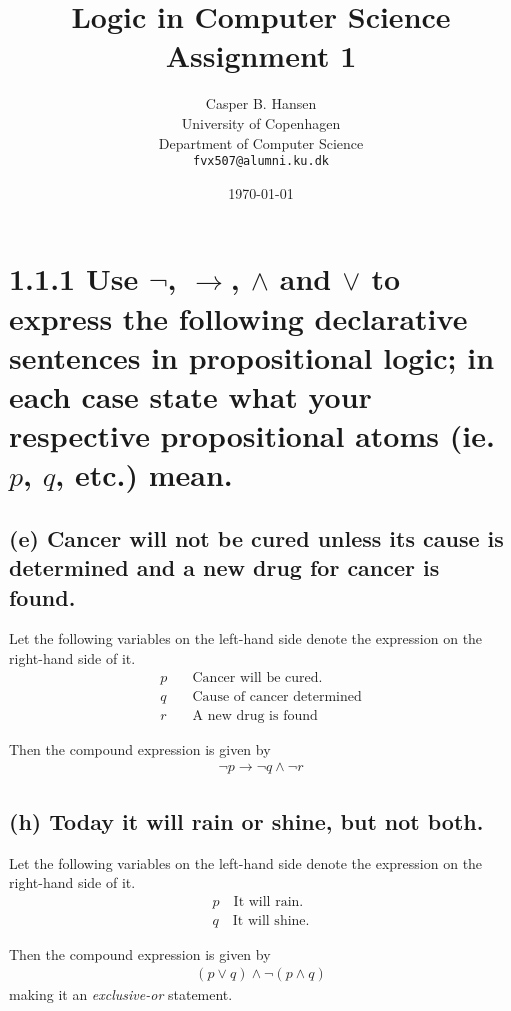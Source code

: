 \documentclass[11pt,a4paper]{article}
\title
{
{\Large Logic in Computer Science}\\
Assignment 1
}
\author
{
	Casper B. Hansen\\
	University of Copenhagen\\
	Department of Computer Science\\
	{\tt fvx507@alumni.ku.dk}
}
\date{\today}
\let\implies\to
\begin{document}
\maketitle

\section*{1.1.1 \mdseries Use $\neg$, $\implies$, $\land$ and $\lor$ to express the following declarative sentences in propositional logic; in each case state what your respective propositional atoms (ie. $p$, $q$, etc.) mean.}

\subsection*{(e) \mdseries Cancer will not be cured unless its cause is determined and a new drug for cancer is found.}

Let the following variables on the left-hand side denote the expression on the right-hand side of it.
\begin{align*}
	p \quad &\text{Cancer will be cured.} \\
	q \quad &\text{Cause of cancer determined} \\
	r \quad &\text{A new drug is found}
\end{align*}

Then the compound expression is given by
\begin{align*}
	\neg p \implies \neg q \land \neg r
\end{align*}

\subsection*{(h) \mdseries Today it will rain or shine, but not both.}

Let the following variables on the left-hand side denote the expression on the right-hand side of it.
\begin{align*}
	p \quad \text{It will rain.} \\
	q \quad \text{It will shine.}
\end{align*}

Then the compound expression is given by
\begin{align*}
	(p \lor q) \land \neg (p \land q)
\end{align*}
making it an {\it exclusive-or} statement.
\end{document}
